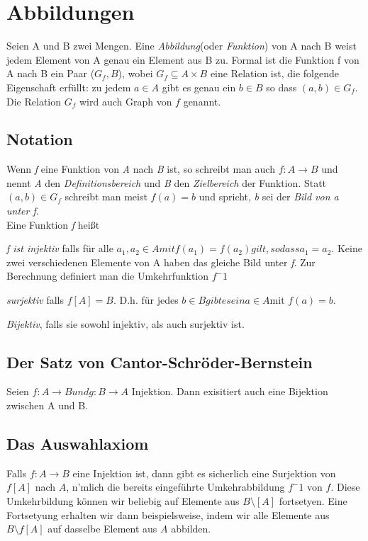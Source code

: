 \documentclass{scrartcl}
\begin{document}
\section{Abbildungen}
Seien A und B zwei Mengen. Eine \emph{Abbildung}(oder \emph{Funktion}) von A nach B weist jedem Element von A genau ein Element aus B zu. Formal ist die Funktion f von A nach B ein Paar ($G_f,B$), wobei $G_f \subseteq A \times B$ eine Relation ist, die folgende Eigenschaft erfüllt: zu jedem $a \in A$ gibt es genau ein $b \in B$ so dass $(a,b) \in G_f$. Die Relation $G_f$ wird auch Graph von $f$ genannt.
\\
\subsection{Notation}
Wenn \emph{f} eine Funktion von \emph{A} nach \emph{B} ist, so schreibt man auch $f:A \to B$ und nennt \emph{A} den \emph{Definitionsbereich} und \emph{B} den \emph{Zielbereich} der Funktion. Statt $(a,b) \in G_f$ schreibt man meist $f(a)=b$ und spricht, \emph{b} sei der \emph{Bild von a unter f}.
\\
Eine Funktion \emph{f} heißt
\begin{description}
	\item \emph{f ist injektiv} falls für alle $a_1,a_2 \in A mit f(a_1)=f(a_2) gilt,so dass a_1=a_2$. Keine zwei verschiedenen Elemente von A haben das gleiche Bild unter \emph{f}. Zur Berechnung definiert man die Umkehrfunktion $f^-1$
	\item \emph{surjektiv} falls $f[A] = B$. D.h. für jedes $b \in B gibt es ein a \in A $mit $f(a)=b$.
	\item \emph{Bijektiv}, falls sie sowohl injektiv, als auch surjektiv ist. 
\end{description}
\subsection{Der Satz von Cantor-Schr\"oder-Bernstein}
Seien $f: A \to B und g: B \to A$ Injektion. Dann exisitiert auch eine Bijektion zwischen A und B. 
\\
\subsection{Das Auswahlaxiom}
Falls $f: A\to B$ eine Injektion ist, dann gibt es sicherlich eine Surjektion von $f[A]$ nach $A$, n'mlich die bereits eingeführte Umkehrabbildung $f^-1$ von $f$. Diese Umkehrbildung können wir beliebig auf Elemente aus $B\setminus[A]$ fortsetyen. Eine Fortsetyung erhalten wir dann beispielsweise, indem wir alle Elemente aus $B\setminus f[A]$ auf dasselbe Element aus $A$ abbilden. \\
\end{document}
